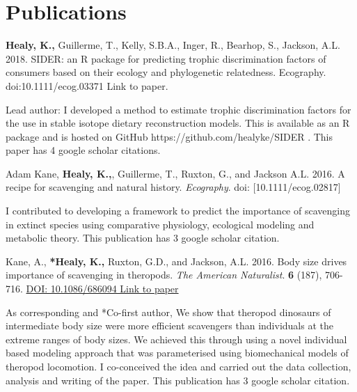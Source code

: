 \documentclass[10pt,a4paper]{article}
\begin{document}
\bigskip

\section{Publications}
\begin{flushleft}


\setlength{\parindent}{0mm}\textbf{Healy, K.,} Guillerme, T., Kelly, S.B.A., Inger, R., Bearhop, S., Jackson, A.L. 2018. SIDER: an R package for predicting trophic discrimination factors of consumers based on their ecology and phylogenetic relatedness. Ecography. {doi:10.1111/ecog.03371 Link to paper}.
\smallskip
\par{\fontsize{10.5}{10} Lead author: I developed a method to estimate trophic discrimination factors for the use in stable isotope dietary reconstruction models. This is available as an R package and is hosted on GitHub https://github.com/healyke/SIDER . This paper has 4 google scholar citations.}

\bigskip

\setlength{\parindent}{0mm} Adam Kane, \textbf{Healy, K.,}, Guillerme, T., Ruxton, G., and Jackson A.L. 2016. A recipe for scavenging and natural history. \textit{Ecography}. doi: [10.1111/ecog.02817]
\smallskip
\par{\fontsize{10.5}{10} I contributed to developing a framework to predict the importance of scavenging in extinct species using comparative physiology, ecological modeling and metabolic theory. This publication has 3 google scholar citation.}

\bigskip

\setlength{\parindent}{0mm}Kane, A., \textbf{*Healy, K.,} Ruxton, G.D., and Jackson, A.L. 2016. Body size drives importance of scavenging in theropods. \textit{The American Naturalist}. \textbf{6} (187), 706-716. \href{https://www.researchgate.net/profile/Kevin_Healy/publication/301279301_Body_Size_as_a_Driver_of_Scavenging_in_Theropod_Dinosaurs/links/570f8b2a08ae38897ba19c35.pdf.}{DOI: 10.1086/686094 Link to paper}
\smallskip
\par{\fontsize{10.5}{10} As corresponding and *Co-first author, We show that theropod dinosaurs of intermediate body size were more efficient scavengers than individuals at the extreme ranges of body sizes. We achieved this through using a novel individual based modeling approach that was parameterised using biomechanical models of theropod locomotion. I co-conceived the idea and carried out the data collection, analysis and writing of the paper. This publication has 3 google scholar citation.}


\end{flushleft}
\end{document}
